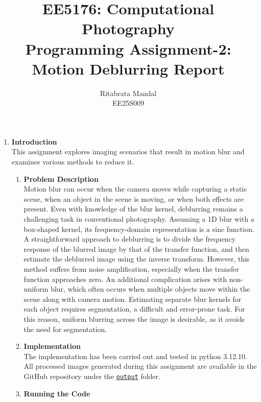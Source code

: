 \documentclass[11pt, a4]{article}
\begin{document}
	\pagestyle{fancy}
	\fancyhead{}\fancyfoot{}
	\author{Ritabrata Mandal\\ EE25S009}
	\title{EE5176: Computational Photography\\Programming Assignment-2: Motion Deblurring Report}
	\maketitle
	
	\medskip
	\newpage
	\begin{enumerate}[label=\arabic*.,start=0]
		\item \textbf{Introduction}\\
		This assignment explores imaging scenarios that result in motion blur and examines various methods to reduce it. 
		\begin{enumerate}
			\item \textbf{Problem Description}\\
			 Motion blur can occur when the camera moves while capturing a static scene, when an object in the scene is moving, or when both effects are present. Even with knowledge of the blur kernel, deblurring remains a challenging task in conventional photography. Assuming a 1D blur with a box-shaped kernel, its frequency-domain representation is a sinc function. A straightforward approach to deblurring is to divide the frequency response of the blurred image by that of the transfer function, and then estimate the deblurred image using the inverse transform. However, this method suffers from noise amplification, especially when the transfer function approaches zero. An additional complication arises with non-uniform blur, which often occurs when multiple objects move within the scene along with camera motion. Estimating separate blur kernels for each object requires segmentation, a difficult and error-prone task. For this reason, uniform blurring across the image is desirable, as it avoids the need for segmentation.  
			 \item \textbf{Implementation}\\
			 The implementation has been carried out and tested in python 3.12.10. All processed images generated during this assignment are available in the GitHub repository under the  			 \href{https://github.com/RitabrataMandal/EE5176/tree/master/Assignments/Assignment2/output}{\texttt{output}} folder.
			 \item \textbf{Running the Code}\\

\end{enumerate}
\end{enumerate}
\end{document}

